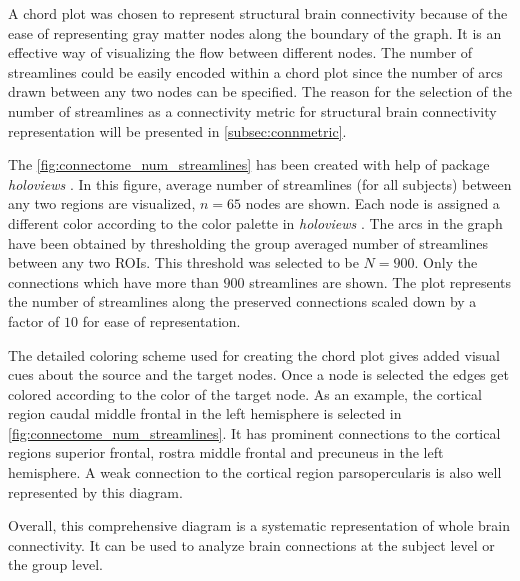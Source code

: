 \documentclass[msthesis.tex]{subfiles}
\begin{document}
A chord plot was chosen to represent structural brain connectivity because of the ease of representing gray matter nodes along the boundary of the graph. It is an effective way of visualizing the flow between different nodes. The number of streamlines could be easily encoded within a chord plot since the number of arcs drawn between any two nodes can be specified. The reason for the selection of the number of streamlines as a connectivity metric for structural brain connectivity representation will be presented in \autoref{subsec:connmetric}.

The \cref{fig:connectome_num_streamlines} has been created with help of package \textit{holoviews} \citep{stevens2015holoviews}. In this figure, average number of streamlines (for all subjects) between any two regions are visualized, $n=65$ nodes are shown. Each node is assigned a different color according to the color palette in \textit{holoviews} \citep{stevens2015holoviews}. The arcs in the graph have been obtained by thresholding the group averaged number of streamlines between any two ROIs. This threshold was selected to be $N=900$. Only the connections which have more than $900$ streamlines are shown. The plot represents the number of streamlines along the preserved connections scaled down by a factor of $10$ for ease of representation.

The detailed coloring scheme used for creating the chord plot gives added visual cues about the source and the target nodes. Once a node is selected the edges get colored according to the color of the target node. As an example, the cortical region caudal middle frontal in the left hemisphere is selected in \cref{fig:connectome_num_streamlines}. It has prominent connections to the cortical regions superior frontal, rostra middle frontal and precuneus in the left hemisphere. A weak connection to the cortical region parsopercularis is also well represented by this diagram. 

Overall, this comprehensive diagram is a systematic representation of whole brain connectivity. It can be used to analyze brain connections at the subject level or the group level.
\end{document}
